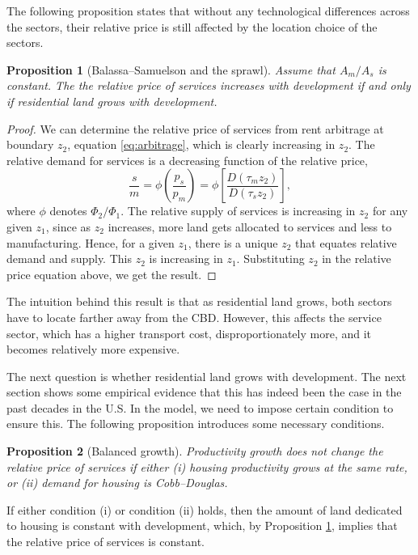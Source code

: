 \documentclass[12pt]{article}
\newtheorem{proposition}{Proposition}
\begin{document}
The following proposition states that without any technological differences across the sectors, their relative price is still affected by the location choice of the sectors.
\begin{proposition}[Balassa--Samuelson and the sprawl]\label{prop:sprawl}
 Assume that $A_m/A_s$ is constant. The the relative price of services increases with development if and only if residential land grows with development.
\end{proposition}
\begin{proof}
We can determine the relative price of services from rent arbitrage at boundary $z_2$, equation \eqref{eq:arbitrage}, which is clearly increasing in $z_2$. The relative demand for services is a decreasing function of the relative price,
    \[
    \frac{s}{m} = \phi\left(\frac{p_s}{p_m}\right) = \phi\left[\frac{D(\tau_m z_2)}{D(\tau_s z_2)}\right],
    \]
where $\phi$ denotes $\Phi_2/\Phi_1$. The relative supply of services is increasing in $z_2$ for any given $z_1$, since as $z_2$ increases, more land gets allocated to services and less to manufacturing. Hence, for a given $z_1$, there is a unique $z_2$ that equates relative demand and supply. This $z_2$ is increasing in $z_1$. Substituting $z_2$ in the relative price equation above, we get the result.
\end{proof}

The intuition behind this result is that as residential land grows, both sectors have to locate farther away from the CBD. However, this affects the service sector, which has a higher transport cost, disproportionately more, and it becomes relatively more expensive.

The next question is whether residential land grows with development. The next section shows some empirical evidence that this has indeed been the case in the past decades in the U.S. In the model, we need to impose certain condition to ensure this. The following proposition introduces some necessary conditions.

\begin{proposition}[Balanced growth]
Productivity growth does not change the relative price of services if either
      (i) housing productivity grows at the same rate,
      or (ii) demand for housing is Cobb--Douglas.
\end{proposition}
If either condition (i) or condition (ii) holds, then the amount of land dedicated to housing is constant with development, which, by Proposition \ref{prop:sprawl}, implies that the relative price of services is constant.
\end{document}
